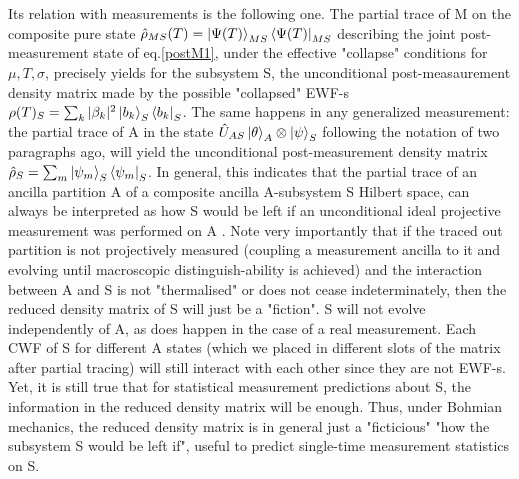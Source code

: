 \documentclass[11pt, a4paper]{article} %
\begin{document}
Its relation with measurements is the following one. The partial trace of M on the composite pure state $\hat{\rho}_{MS}(T)=\ket{\Psi(T)}_{MS}\bra{\Psi(T)}_{MS}$ describing the joint post-measurement state of eq.\eqref{postM1}, under the effective "collapse" conditions for $\mu,T,\sigma$, precisely yields for the subsystem S, the unconditional post-measaurement density matrix made by the possible "collapsed" EWF-s $\rho(T)_S=\sum_k |\beta_k|^2\ket{b_k}_S\bra{b_k}_S$. The same happens in any generalized measurement: the partial trace of A in the state $\hat{U}_{AS}\ket{\theta}_A\otimes\ket{\psi}_S$ following the notation of two paragraphs ago, will yield the unconditional post-measurement density matrix $\hat{\rho}_S=\sum_m \ket{\psi_m}_S\bra{\psi_m}_S$. In general, this indicates that the partial trace of an ancilla partition A of a composite ancilla A-subsystem S Hilbert space, can always be interpreted as how S would be left if an unconditional ideal projective measurement was performed on A \cite{Generalized}. Note very importantly that if the traced out partition is not projectively measured (coupling a measurement ancilla to it and evolving until macroscopic distinguish-ability is achieved) and the interaction between A and S is not "thermalised" or does not cease indeterminately, then the reduced density matrix of S will just be a "fiction". S will not evolve independently of A, as does happen in the case of a real measurement. Each CWF of S for different A states (which we placed in different slots of the matrix after partial tracing) will still interact with each other since they are not EWF-s. Yet, it is still true that for statistical measurement predictions about S, the information in the reduced density matrix will be enough. Thus, under Bohmian mechanics, the reduced density matrix is in general just a "ficticious" "how the subsystem S would be left if", useful to predict single-time measurement statistics on S.
\end{document}
